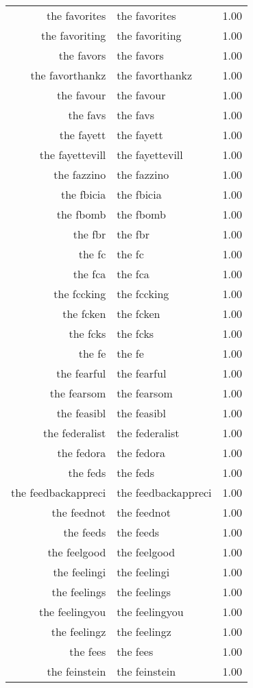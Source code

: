 \begin{table}[ht]
\begin{tabular}{rlr}
  the favorites & the favorites & 1.00 \\ 
  the favoriting & the favoriting & 1.00 \\ 
  the favors & the favors & 1.00 \\ 
  the favorthankz & the favorthankz & 1.00 \\ 
  the favour & the favour & 1.00 \\ 
  the favs & the favs & 1.00 \\ 
  the fayett & the fayett & 1.00 \\ 
  the fayettevill & the fayettevill & 1.00 \\ 
  the fazzino & the fazzino & 1.00 \\ 
  the fbicia & the fbicia & 1.00 \\ 
  the fbomb & the fbomb & 1.00 \\ 
  the fbr & the fbr & 1.00 \\ 
  the fc & the fc & 1.00 \\ 
  the fca & the fca & 1.00 \\ 
  the fccking & the fccking & 1.00 \\ 
  the fcken & the fcken & 1.00 \\ 
  the fcks & the fcks & 1.00 \\ 
  the fe & the fe & 1.00 \\ 
  the fearful & the fearful & 1.00 \\ 
  the fearsom & the fearsom & 1.00 \\ 
  the feasibl & the feasibl & 1.00 \\ 
  the federalist & the federalist & 1.00 \\ 
  the fedora & the fedora & 1.00 \\ 
  the feds & the feds & 1.00 \\ 
  the feedbackappreci & the feedbackappreci & 1.00 \\ 
  the feednot & the feednot & 1.00 \\ 
  the feeds & the feeds & 1.00 \\ 
  the feelgood & the feelgood & 1.00 \\ 
  the feelingi & the feelingi & 1.00 \\ 
  the feelings & the feelings & 1.00 \\ 
  the feelingyou & the feelingyou & 1.00 \\ 
  the feelingz & the feelingz & 1.00 \\ 
  the fees & the fees & 1.00 \\ 
  the feinstein & the feinstein & 1.00 \\ 

\end{tabular}
\end{table}
